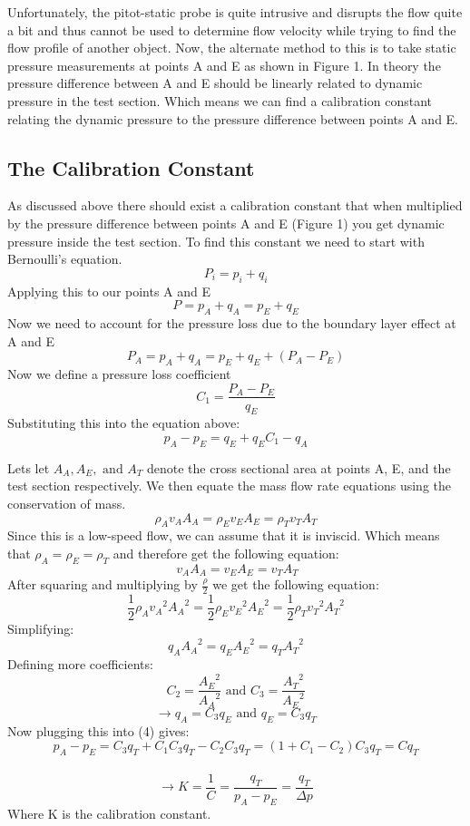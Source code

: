 \documentclass[12pt]{article}
\begin{document}
Unfortunately, the pitot-static probe is quite intrusive and disrupts the flow quite a bit and thus cannot be used to determine flow velocity while trying to find the flow profile of another object. Now, the alternate method to this is to take static pressure measurements at points A and E as shown in Figure 1. In theory the pressure difference between A and E should be linearly related to dynamic pressure in the test section. Which means we can find a calibration constant relating the dynamic pressure to the pressure difference between points A and E.

\subsection{The Calibration Constant}
As discussed above there should exist a calibration constant that when multiplied by the pressure difference between points A and E (Figure 1) you get dynamic pressure inside the test section. To find this constant we need to start with Bernoulli's equation. 
\[P_i = p_i+q_i\]
Applying this to our points A and E
\[P = p_A+q_A = p_E + q_E\]
Now we need to account for the pressure loss due to the boundary layer effect at A and E
\[P_A = p_A + q_A = p_E+q_E+(P_A -P_E )\]
Now we define a pressure loss coefficient
\[C_1 = \frac{P_A -P_E }{q_E}\]
Substituting this into the equation above:
\begin{equation}
    p_A-p_E=q_E+q_EC_1-q_A
\end{equation}

Lets let \(A_A, A_E, \mbox{ and }A_T\) denote the cross sectional area at points A, E, and the test section respectively. We then equate the mass flow rate equations using the conservation of mass.
\[\rho_A v_A A_A = \rho_E v_E A_E = \rho_T v_T A_T\]
Since this is a low-speed flow, we can assume that it is inviscid. Which means that \( \rho_A =\rho_E=\rho_T \) and therefore get the following equation:
\[\ v_A A_A =  v_E A_E = v_T A_T\]
After squaring and multiplying by \(\frac{\rho}{2}\) we get the following equation:
\[\frac{1}{2}\rho_A {v_A}^2 {A_A}^2 = \frac{1}{2}\rho_E {v_E}^2 {A_E}^2=\frac{1}{2}\rho_T {v_T}^2 {A_T}^2\]
Simplifying:
\[q_A {A_A}^2 = q_E {A_E}^2 = q_T {A_T}^2\]
Defining more coefficients:
\[C_2 = \frac{{A_E}^2}{{A_A}^2} \mbox{ and } C_3 = \frac{{A_T}^2}{{A_E}^2}\]
\[\rightarrow  q_A = C_3 q_E \mbox{ and } q_E = C_3 q_T\]
Now plugging this into (4) gives:
\[p_A-p_E = C_3 q_T +C_1 C_3 q_T - C_2 C_3 q_T = (1+C_1-C_2)C_3 q_T=C q_T\]\
\begin{equation}
    \rightarrow K=\frac{1}{C} = \frac{q_T}{p_A-p_E} =\frac{q_T}{\Delta p}
\end{equation}
Where K is the calibration constant.
\end{document}
